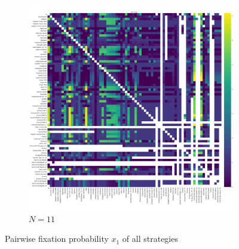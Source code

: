 \documentclass{article}
\begin{document}
\begin{figure}[!hbtp]
    \begin{subfigure}[t]{.3\textwidth}
        \centering
        \includegraphics[width=.8\textwidth]{../img/fixation_heatmap_11_invade.pdf}
        \caption{\(N=11\)}

    \end{subfigure}%

    \caption{Pairwise fixation probability \(x_{1}\) of all strategies}
    \label{fig:fixation_heatmap_invade}
\end{figure}
\end{document}
